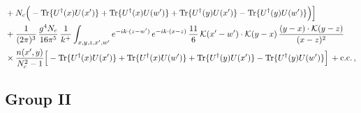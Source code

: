 \documentclass[9pt]{article}
\numberwithin{equation}{section}
\begin{document}
\begin{align}
&+N_{c}\Big(-{\rm Tr}\{U^{\dagger}(x)U(x')\}+{\rm Tr}\{U^{\dagger}(x)U(w')\}+{\rm Tr}\{U^{\dagger}(y)U(x')\}-{\rm Tr}\{U^{\dagger}(y)U(w')\}\Big)\Big]\notag\\
&+\frac{1}{(2\pi)^{3}}\,\frac{g^{4}N_{c}}{16\pi^{5}}\,\frac{1}{k^{+}}\int_{x,y,z,x',w'}e^{-ik\cdot(z-w')}\,e^{-ik\cdot(x-z)}\,\frac{11}{6}\,\mathcal{K}(x'-w')\cdot\mathcal{K}(y-x)\,\frac{(y-x)\cdot\mathcal{K}(y-z)}{(x-z)^{2}}\notag\\
&\times\frac{n(x',y)}{N_{c}^{2}-1}\Big[-{\rm Tr}\{U^{\dagger}(x)U(x')\}+{\rm Tr}\{U^{\dagger}(x)U(w')\}+{\rm Tr}\{U^{\dagger}(y)U(x')\}-{\rm Tr}\{U^{\dagger}(y)U(w')\}\Big]\,+{\rm c.c.}\,,\label{eq:E-I.V-2o}
\end{align}
\subsection{Group II}
\end{document}
